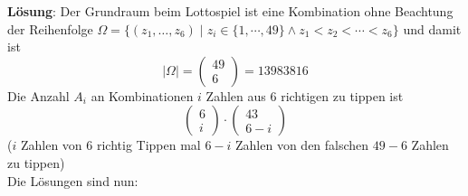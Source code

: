 \documentclass[a4paper,13pt]{scrartcl}
\newcommand{\solution}{\vspace*{0.2cm}
\noindent
\textbf{Lösung}: }
\begin{document}
\solution
 Der Grundraum beim Lottospiel ist eine Kombination ohne Beachtung der Reihenfolge
$\Omega = \{ (z_1, \dots,  z_6) \; | \;  z_i \in \{1, \cdots, 49 \} \land z_1 < z_2 < \cdots < z_6 \}$ und damit ist $$| \Omega| = \begin{pmatrix} 
    49 \\ 6 \end{pmatrix} = 13983816$$
Die Anzahl $A_i$ an Kombinationen $i$  Zahlen aus $6$ richtigen zu tippen ist $$ \begin{pmatrix} 
    6 \\ i \end{pmatrix} \cdot \begin{pmatrix} 
    43   \\ 6 -i \end{pmatrix}$$ ($i$ Zahlen von $6$ richtig Tippen mal $6-i$ Zahlen von den falschen $49-6$ Zahlen zu tippen)\\
Die Lösungen sind nun:
\end{document}
